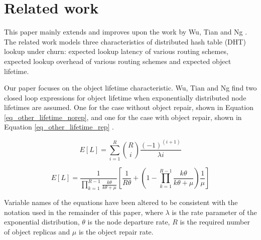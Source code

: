 \documentclass[10pt,a4paper,conference]{IEEEtran}
\begin{document}
\section{Related work}
\label{related_work}

This paper mainly extends and improves upon the work by Wu, Tian and Ng \cite{replication_article}. The related work models three characteristics of distributed hash table (DHT) lookup under churn: expected lookup latency of various routing schemes, expected lookup overhead of various routing schemes and expected object lifetime.

Our paper focuses on the object lifetime characteristic. Wu, Tian and Ng find two closed loop expressions for object lifetime when exponentially distributed node lifetimes are assumed. One for the case without object repair, shown in Equation \eqref{eq_other_lifetime_norep}, and one for the case with object repair, shown in Equation \eqref{eq_other_lifetime_rep} \cite{replication_article}.

\begin{equation} \label{eq_other_lifetime_norep}
    E[L] = \sum_{i = 1}^{R}{{R}\choose{i}}\frac{(-1)^{(i+1)}}{\lambda i}
\end{equation}

\begin{equation} \label{eq_other_lifetime_rep}
    E[L] = \frac{1}{\prod_{k=1}^{R-1}\frac{k\theta}{k\theta+\mu}} \left[\frac{1}{R\theta} + \left(1 - \prod_{k=1}^{R-1}\frac{k\theta}{k\theta + \mu}\right)\frac{1}{\mu}\right]
\end{equation}

Variable names of the equations have been altered to be consistent with the notation used in the remainder of this paper, where $\lambda$ is the rate parameter of the exponential distribution, $\theta$ is the node departure rate, $R$ is the required number of object replicas and $\mu$ is the object repair rate.
\end{document}
